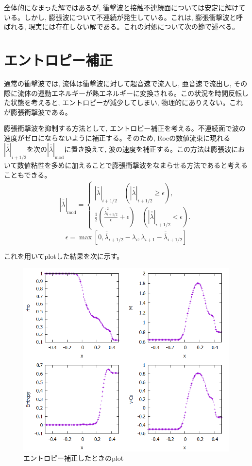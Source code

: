 \documentclass[dvipdfmx,b5paper]{jsarticle}
\newcommand{\oover}[1]{\overline{\overline{#1}}}
\begin{document}
全体的になまった解ではあるが, 衝撃波と接触不連続面については安定に解けている。しかし, 膨張波について不連続が発生している。これは, 膨張衝撃波と呼ばれる, 現実には存在しない解である。これの対処について次の節で述べる。

\section{エントロピー補正}
通常の衝撃波では, 流体は衝撃波に対して超音速で流入し, 亜音速で流出し, その際に流体の運動エネルギーが熱エネルギーに変換される。この状況を時間反転した状態を考えると, エントロピーが減少してしまい, 物理的にありえない。これが膨張衝撃波である。

膨張衝撃波を抑制する方法として, エントロピー補正を考える。不連続面で波の速度がゼロにならないように補正する。そのため, Roeの数値流束に現れる$|\oover{\lambda}|_{i+1/2}$を次の$|\oover{\lambda}|_{\mathrm{mod}}$に置き換えて, 波の速度を補正する。この方法は膨張波において数値粘性を多めに加えることで膨張衝撃波をなまらせる方法であると考えることもできる。
\begin{eqnarray*}
  |\oover{\lambda}|_{\mathrm{mod}}=
    \begin{cases}
      |\oover{\lambda}|_{i+1/2}\quad (|\oover{\lambda}|_{i+1/2}\geq\epsilon), \\
      \frac{1}{2}\left(\frac{\oover{\lambda}_{i+1/2}^2}{\epsilon}+\epsilon\right)\quad (|\oover{\lambda}|_{i+1/2}<\epsilon). 
    \end{cases}
\end{eqnarray*}
\begin{equation}
  \epsilon=\max[0, \oover{\lambda}_{i+1/2}-\lambda_i, \lambda_{i+1}-\oover{\lambda}_{i+1/2}]
\end{equation}

これを用いてplotした結果を次に示す。
\begin{figure}[H]
  \centering
  \includegraphics[width = 0.8\linewidth]{../book/chap03/02_entropy-modify/out/01.png}
  \caption{エントロピー補正したときのplot}
  \label{fig:entropy}
\end{figure}
\end{document}
